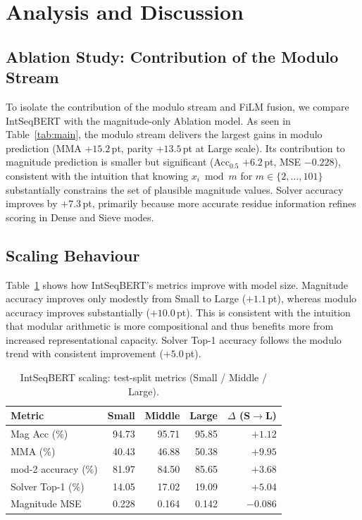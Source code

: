 
\section{Analysis and Discussion}
\label{sec:analysis}

\subsection{Ablation Study: Contribution of the Modulo Stream}
\label{sec:ablation}

To isolate the contribution of the modulo stream and FiLM fusion, we compare IntSeqBERT with
the magnitude-only Ablation model. As seen in Table~\ref{tab:main}, the modulo stream
delivers the largest gains in modulo prediction (MMA $+15.2$\,pt, parity $+13.5$\,pt at Large
scale). Its contribution to magnitude prediction is smaller but significant (Acc$_{0.5}$
$+6.2$\,pt, MSE $-0.228$), consistent with the intuition that knowing $x_i \bmod m$ for
$m \in \{2,\ldots,101\}$ substantially constrains the set of plausible magnitude values.
Solver accuracy improves by $+7.3$\,pt, primarily because more accurate residue information
refines scoring in Dense and Sieve modes.

\subsection{Scaling Behaviour}
\label{sec:scaling}

Table~\ref{tab:scale_trend} shows how IntSeqBERT's metrics improve with model size.
Magnitude accuracy improves only modestly from Small to Large ($+1.1$\,pt), whereas modulo
accuracy improves substantially ($+10.0$\,pt). This is consistent with the intuition that
modular arithmetic is more compositional and thus benefits more from increased representational
capacity. Solver Top-1 accuracy follows the modulo trend with consistent improvement ($+5.0$\,pt).

\begin{table}[htbp]
\caption{IntSeqBERT scaling: test-split metrics (Small / Middle / Large).}
\label{tab:scale_trend}
\centering
\begin{tabular}{lrrrr}
\hline
Metric              & Small  & Middle & Large  & $\Delta$ (S$\to$L) \\
\hline
Mag Acc (\%)        &  94.73 &  95.71 &  95.85 & $+1.12$ \\
MMA (\%)            &  40.43 &  46.88 &  50.38 & $+9.95$ \\
mod-2 accuracy (\%) &  81.97 &  84.50 &  85.65 & $+3.68$ \\
Solver Top-1 (\%)   &  14.05 &  17.02 &  19.09 & $+5.04$ \\
Magnitude MSE       &  0.228 &  0.164 &  0.142 & $-0.086$\\
\hline
\end{tabular}
\end{table}

